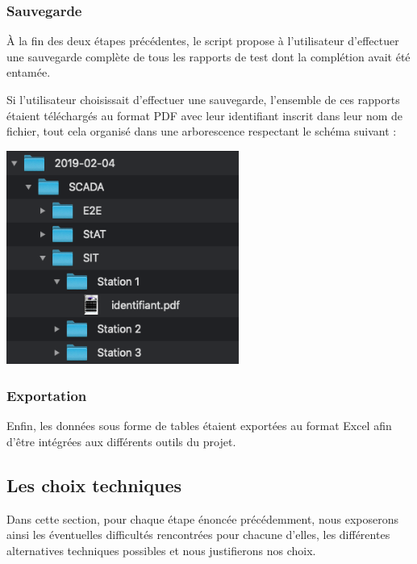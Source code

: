 \subsubsection{Sauvegarde}
À la fin des deux étapes précédentes, le script propose à l'utilisateur d'effectuer une sauvegarde complète de tous les rapports de test dont la complétion avait été entamée.

Si l'utilisateur choisissait d'effectuer une sauvegarde, l'ensemble de ces rapports étaient téléchargés au format PDF avec leur identifiant inscrit dans leur nom de fichier, tout cela organisé dans une arborescence respectant le schéma suivant :

\begin{center}
\includegraphics[height=7cm]{ressources/images/figures/tree.png}
\end{center}

\subsubsection{Exportation}

Enfin, les données sous forme de tables étaient exportées au format Excel afin d'être intégrées aux différents outils du projet.

\subsection{Les choix techniques}

Dans cette section, pour chaque étape énoncée précédemment, nous exposerons ainsi les éventuelles difficultés rencontrées pour chacune d'elles, les différentes alternatives techniques possibles et nous justifierons nos choix.

